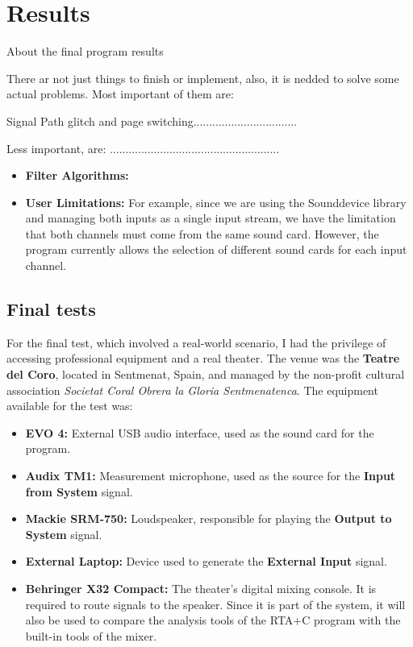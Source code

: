 \chapter{Results}

About the final program results

There ar not just things to finish or implement, also, it is nedded to solve some actual problems. Most important of them are:

Signal Path glitch and page switching.................................

Less important, are: ......................................................

\begin{itemize}
	\item \textbf{Filter Algorithms:}
	
	\item \textbf{User Limitations:} For example, since we are using the Sounddevice library and managing both inputs as a single input stream, we have the limitation that both channels must come from the same sound card. However, the program currently allows the selection of different sound cards for each input channel.
	
\end{itemize}

\section{Final tests}

For the final test, which involved a real-world scenario, I had the privilege of accessing professional equipment and a real theater. The venue was the \textbf{Teatre del Coro}, located in Sentmenat, Spain, and managed by the non-profit cultural association \textit{Societat Coral Obrera la Gloria Sentmenatenca}. The equipment available for the test was:

\begin{itemize}
	\item \textbf{EVO 4:} External USB audio interface, used as the sound card for the program.
	\item \textbf{Audix TM1:} Measurement microphone, used as the source for the \textbf{Input from System} signal.
	\item \textbf{Mackie SRM-750:} Loudspeaker, responsible for playing the \textbf{Output to System} signal.
	\item \textbf{External Laptop:} Device used to generate the \textbf{External Input} signal.
	\item \textbf{Behringer X32 Compact:} The theater's digital mixing console. It is required to route signals to the speaker. Since it is part of the system, it will also be used to compare the analysis tools of the RTA+C program with the built-in tools of the mixer.
\end{itemize}

